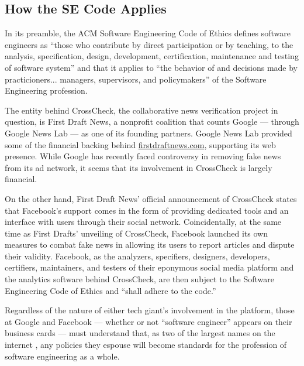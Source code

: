

\subsection{How the SE Code Applies}

\par In its preamble, the ACM Software Engineering Code of Ethics defines software engineers as ``those who contribute by direct participation or by teaching, to the analysis, specification, design, development, certification, maintenance and testing of software system'' and that it applies to ``the behavior of and decisions made by practicioners... managers, supervisors, and policymakers'' of the Software Engineering profession. \cite{se_code}

\par The entity behind CrossCheck, the collaborative news verification project in question, is First Draft News, a nonprofit coalition that counts Google --- through Google News Lab --- as one of its founding partners. Google News Lab provided some of the financial backing behind \url{firstdraftnews.com}, supporting its web presence. \cite{firstdraftnews_about} While Google has recently faced controversy in removing fake news from its ad network, \cite{tc_google_took_down_ads} it seems that its involvement in CrossCheck is largely financial.

\par On the other hand, First Draft News' official announcement of CrossCheck states that Facebook's support comes in the form of providing dedicated tools and an interface with users through their social network. \cite{crosscheck_launch} Coincidentally, at the same time as First Drafts' unveiling of CrossCheck, Facebook launched its own measures to combat fake news in allowing its users to report articles and dispute their validity. \cite{tc_google_fb_partner} Facebook, as the analyzers, specifiers, designers, developers, certifiers, maintainers, and testers of their eponymous social media platform and the analytics software behind CrossCheck, are then subject to the Software Engineering Code of Ethics and ``shall adhere to the code.'' \cite{se_code}

\par Regardless of the nature of either tech giant's involvement in the platform, those at Google and Facebook --- whether or not ``software engineer'' appears on their business cards --- must understand that, as two of the largest names on the internet , any policies they espouse will become standards for the profession of software engineering as a whole.

